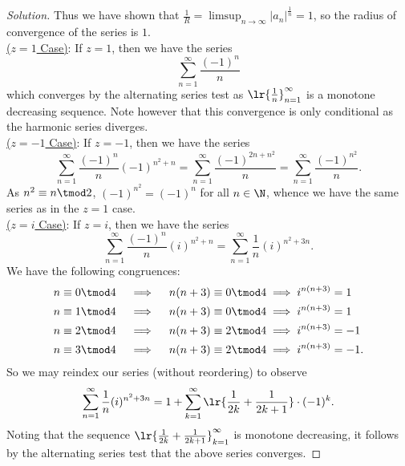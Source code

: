 \documentclass[12pt]{article}
\begin{document}
\begin{homeworkProblem}
\begin{proof}[Solution]
  Thus we have shown that $ \frac{1}{R} = \limsup_{n\to\infty} |a_{n}|^{\frac{1}{n}} = 1$, so the radius of convergence of the series is $ 1 $.\\


  \underline{($ z=1 $ Case)}: If $ z=1 $, then we have the series
  \[
    \sum_{n=1}^{\infty} \frac{(-1)^{n}}{n}
  \]
  which converges by the alternating series test as $ \lr{\frac{1}{n}}_{n=1}^{\infty} $ is a monotone decreasing sequence. Note however that this convergence is only conditional as the harmonic series diverges.\\

  \underline{($ z=-1 $ Case)}: If $ z=-1 $, then we have the series
  \[
    \sum_{n=1}^{\infty} \frac{(-1)^{n}}{n}(-1)^{n^{2}+n} = \sum_{n=1}^{\infty} \frac{(-1)^{2n+n^{2}}}{n} = \sum_{n=1}^{\infty} \frac{(-1)^{n^{2}}}{n}.
  \]
  As $ n^{2} \equiv n \tmod 2 $, $ (-1)^{n^{2}} = (-1)^{n} $ for all $ n\in \N $, whence we have the same series as in the $ z=1 $ case.\\

  \underline{($ z=i $ Case)}: If $ z=i $, then we have the series
  \[
    \sum_{n=1}^{\infty} \frac{(-1)^{n}}{n}(i)^{n^{2}+n} = \sum_{n=1}^{\infty} \frac{1}{n}(i)^{n^{2}+3n}.
  \]
  We have the following congruences:
  \begin{align*}
    n\equiv 0\tmod 4 \quad&\implies \quad n(n+3) \equiv 0 \tmod 4 \implies i^{n(n+3)} = 1\\
    n\equiv 1\tmod 4 \quad&\implies \quad n(n+3) \equiv 0 \tmod 4\implies i^{n(n+3)} = 1\\
    n\equiv 2\tmod 4 \quad&\implies \quad n(n+3) \equiv 2 \tmod 4\implies i^{n(n+3)} = -1\\
    n\equiv 3\tmod 4 \quad&\implies \quad n(n+3) \equiv 2 \tmod 4\implies i^{n(n+3)} = -1.
  \end{align*}
  So we may reindex our series (without reordering) to observe
  \begin{align*}
    \sum_{n=1}^{\infty} \frac{1}{n}(i)^{n^{2}+3n} = 1+\sum_{k=1}^{\infty}\lr{ \frac{1}{2k}+\frac{1}{2k+1}}\cdot(-1)^{k}.
  \end{align*}
  Noting that the sequence $ \lr{\frac{1}{2k}+ \frac{1}{2k+1}}_{k=1}^{\infty} $ is monotone decreasing, it follows by the alternating series test that the above series converges.


\end{proof}
\end{homeworkProblem}
\end{document}
